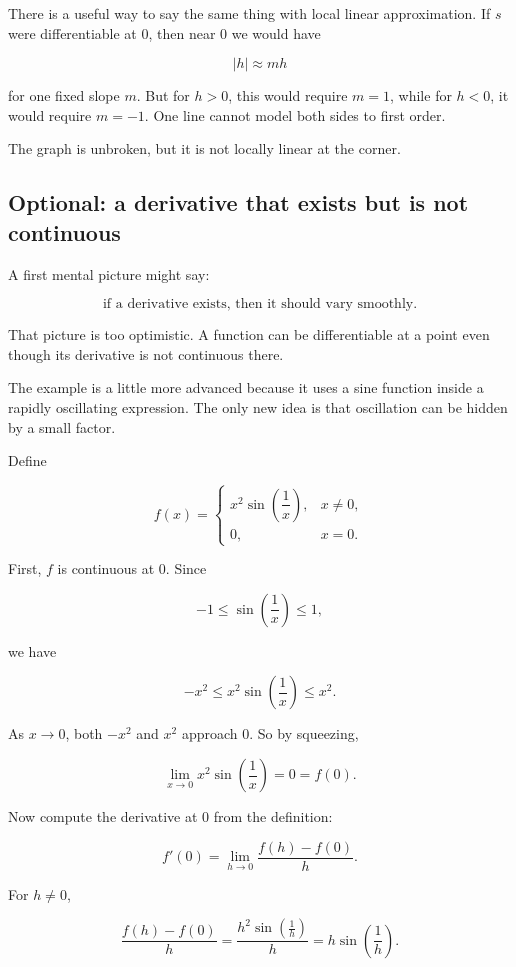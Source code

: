 There is a useful way to say the same thing with local linear approximation.  If \(s\) were differentiable at \(0\), then near \(0\) we would have

\[
|h| \approx mh
\]

for one fixed slope \(m\).  But for \(h>0\), this would require \(m=1\), while for \(h<0\), it would require \(m=-1\).  One line cannot model both sides to first order.

The graph is unbroken, but it is not locally linear at the corner.

\subsection{Optional: a derivative that exists but is not continuous}
\label{subsec:derivative-exists-not-continuous}

A first mental picture might say:

\[
\text{if a derivative exists, then it should vary smoothly.}
\]

That picture is too optimistic.  A function can be differentiable at a point even though its derivative is not continuous there.

The example is a little more advanced because it uses a sine function inside a rapidly oscillating expression.  The only new idea is that oscillation can be hidden by a small factor.

Define

\[
f(x)=
\begin{cases}
x^2\sin\left(\dfrac1x\right), & x\neq0,\\[8pt]
0, & x=0.
\end{cases}
\]

First, \(f\) is continuous at \(0\).  Since

\[
-1\le \sin\left(\frac1x\right)\le 1,
\]

we have

\[
-x^2\le x^2\sin\left(\frac1x\right)\le x^2.
\]

As \(x\to0\), both \(-x^2\) and \(x^2\) approach \(0\).  So by squeezing,

\[
\lim_{x\to0}x^2\sin\left(\frac1x\right)=0=f(0).
\]

Now compute the derivative at \(0\) from the definition:

\[
f'(0)
=
\lim_{h\to0}\frac{f(h)-f(0)}{h}.
\]

For \(h\neq0\),

\[
\frac{f(h)-f(0)}{h}
=
\frac{h^2\sin\left(\frac1h\right)}{h}
=
h\sin\left(\frac1h\right).
\]

